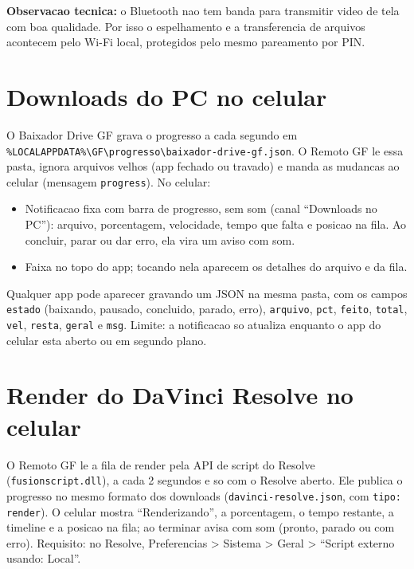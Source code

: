 \documentclass[11pt,a4paper]{article}
\begin{document}
\begin{nota}
\textbf{Observacao tecnica:} o Bluetooth nao tem banda para transmitir video de tela com
boa qualidade. Por isso o espelhamento e a transferencia de arquivos acontecem pelo Wi-Fi
local, protegidos pelo mesmo pareamento por PIN.
\end{nota}

\section{Downloads do PC no celular}

O Baixador Drive GF grava o progresso a cada segundo em
\texttt{\%LOCALAPPDATA\%\textbackslash GF\textbackslash progresso\textbackslash baixador-drive-gf.json}.
O Remoto GF le essa pasta, ignora arquivos velhos (app fechado ou travado) e manda as mudancas
ao celular (mensagem \texttt{progress}). No celular:
\begin{itemize}
  \item Notificacao fixa com barra de progresso, sem som (canal ``Downloads no PC''): arquivo,
  porcentagem, velocidade, tempo que falta e posicao na fila. Ao concluir, parar ou dar erro,
  ela vira um aviso com som.
  \item Faixa no topo do app; tocando nela aparecem os detalhes do arquivo e da fila.
\end{itemize}
Qualquer app pode aparecer gravando um JSON na mesma pasta, com os campos \texttt{estado}
(baixando, pausado, concluido, parado, erro), \texttt{arquivo}, \texttt{pct}, \texttt{feito},
\texttt{total}, \texttt{vel}, \texttt{resta}, \texttt{geral} e \texttt{msg}. Limite: a
notificacao so atualiza enquanto o app do celular esta aberto ou em segundo plano.

\section{Render do DaVinci Resolve no celular}
O Remoto GF le a fila de render pela API de script do Resolve (\texttt{fusionscript.dll}),
a cada 2 segundos e so com o Resolve aberto. Ele publica o progresso no mesmo formato dos
downloads (\texttt{davinci-resolve.json}, com \texttt{tipo: render}). O celular mostra
``Renderizando'', a porcentagem, o tempo restante, a timeline e a posicao na fila; ao terminar
avisa com som (pronto, parado ou com erro). Requisito: no Resolve, Preferencias > Sistema >
Geral > ``Script externo usando: Local''.
\end{document}
